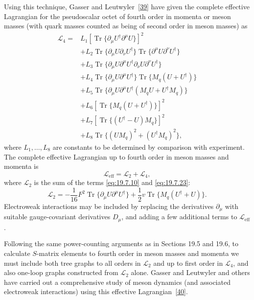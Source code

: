 Using this technique, Gasser and Leutwyler~\hyperref[ch19-ref-39]{[39]} have given the complete effective Lagrangian for the pseudoscalar octet of fourth order in momenta or meson masses (with quark masses counted as being of second order in meson masses) as
\begin{equation}
\begin{aligned}
\mathcal L_4={}&
L_1\left[\operatorname{Tr}
\{\partial_\mu U^\dagger\partial^\mu U\}\right]^2
\\
&+L_2\operatorname{Tr}
\{\partial_\mu U\partial_\nu U^\dagger\}
\operatorname{Tr}
\{\partial^\mu U\partial^\nu U^\dagger\}
\\
&+L_3\operatorname{Tr}
\{\partial_\mu U\partial^\mu U^\dagger
\partial_\nu U\partial^\nu U^\dagger\}
\\
&+L_4\operatorname{Tr}
\{\partial_\mu U\partial^\mu U^\dagger\}
\operatorname{Tr}\{M_q(U+U^\dagger)\}
\\
&+L_5\operatorname{Tr}
\{\partial_\mu U\partial^\mu U^\dagger
(M_qU+U^\dagger M_q)\}
\\
&+L_6\left[\operatorname{Tr}
\{M_q(U+U^\dagger)\}\right]^2
\\
&+L_7\left[\operatorname{Tr}
\{(U^\dagger-U)M_q\}\right]^2
\\
&+L_8\operatorname{Tr}
\{(UM_q)^2+(U^\dagger M_q)^2\},
\end{aligned}
\tag{19.7.28}\label{eq:19.7.28}
\end{equation}
where $L_1,\ldots,L_8$ are constants to be determined by comparison with experiment. The complete effective Lagrangian up to fourth order in meson masses and momenta is
\begin{equation}
\mathcal L_{\text{eff}}=\mathcal L_2+\mathcal L_4,
\tag{19.7.29}\label{eq:19.7.29}
\end{equation}
where $\mathcal L_2$ is the sum of the terms \eqref{eq:19.7.10} and \eqref{eq:19.7.23}:
\begin{equation}
\mathcal L_2
=-\frac{1}{16}F^2\operatorname{Tr}
\{\partial_\mu U\partial^\mu U^\dagger\}
+\frac12v\operatorname{Tr}\{M_q(U^\dagger+U)\}.
\tag{19.7.30}\label{eq:19.7.30}
\end{equation}
Electroweak interactions may be included by replacing the derivatives $\partial_\mu$ with suitable gauge-covariant derivatives $D_\mu$, and adding a few additional terms to $\mathcal L_{\text{eff}}$.

Following the same power-counting arguments as in Sections 19.5 and 19.6, to calculate $S$-matrix elements to fourth order in meson masses and momenta we must include both tree graphs to all orders in $\mathcal L_2$ and up to first order in $\mathcal L_4$, and also one-loop graphs constructed from $\mathcal L_2$ alone. Gasser and Leutwyler and others have carried out a comprehensive study of meson dynamics (and associated electroweak interactions) using this effective Lagrangian~\hyperref[ch19-ref-40]{[40]}.

